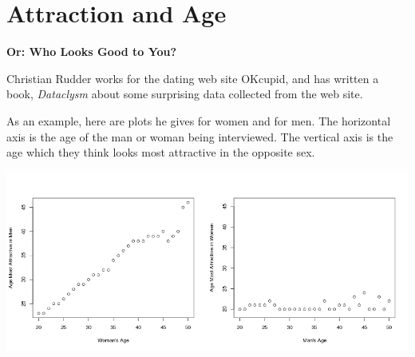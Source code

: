 \def\theTopic{Correlation/Slope }
\def\dayNum{17 }


\section{Attraction and Age}

\begin{center}
{\bf {Or: Who Looks Good to You?}}
\end{center}


Christian Rudder works for the dating web site OKcupid, and has
written a book, {\it Dataclysm} about some surprising data 
collected from the web site.

As an example, here are plots he gives for women and for men.
The horizontal axis is the age of the man or woman being
interviewed. The vertical axis is the age which they think looks most
attractive in the opposite sex.\vspace{-.5cm}

\includegraphics[width=\linewidth]{../plots/attractiveAges.png}

